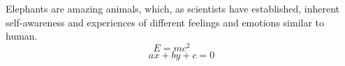 \documentclass[12pt,a4paper]{scrartcl}
\begin{document}
	Elephants are amazing animals, which, as scientists have established, inherent self-awareness and experiences of different feelings and emotions similar to human.
	\[
	\boxed{E=mc^2} \qquad
	\]
	\[ax+by+c=0
	\]
\end{document}
